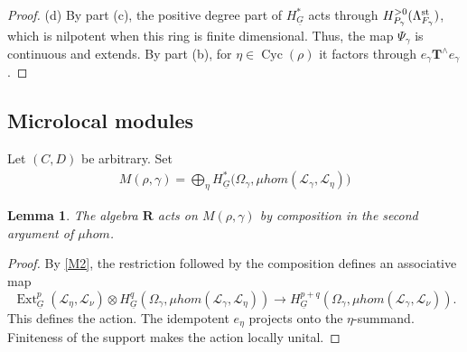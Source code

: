 \documentclass[11pt,reqno]{amsart}
\newtheorem{Lemma}[Theorem]{Lemma}
\theoremstyle{definition}
\theoremstyle{remark}
\def\dG{\underline G}
\def\Ext{\operatorname{Ext}}
\def\Cyc{\operatorname{Cyc}}
\def\muhom{\mu hom}
\def\bR{\mathbf R}
\def\bT{\mathbf T}
\begin{document}
\begin{proof}
(d) By part (c), the positive degree part of $H^*_{\dG}$ acts through $H^{>0}_{P_\gamma}(\Lambda^{\rm st}_{F_\gamma})$, which is nilpotent 
when this ring is finite dimensional.
Thus, the map $\Psi_\gamma$ is continuous and extends. 
By part (b), for $\eta\in\Cyc(\rho)$ it factors through $e_\gamma \bT^\wedge e_\gamma$.
\end{proof}



\subsection{Microlocal modules}
\label{subsec:microlocal-module}
Let $(C,D)$ be arbitrary. Set
\begin{align}\label{microlocal-module}
 M(\rho,\gamma)=
 \bigoplus_\eta
 H_{\dG}^*\bigl(\Omega_\gamma,
             \muhom(\mathscr L_\gamma,\mathscr L_\eta)\bigr)\end{align}

 
 \begin{Lemma}           
The algebra $\bR$ acts on $M(\rho,\gamma)$
by composition in the second argument of $\muhom$. 
\end{Lemma}

\begin{proof}
By \ref{M2}, the restriction followed by the composition defines an associative map
\[
 \Ext^p_{\dG}(\mathscr L_\eta,\mathscr L_\nu)\otimes
 H_{\dG}^q(\Omega_\gamma,\muhom(\mathscr L_\gamma,\mathscr L_\eta))
 \longrightarrow
 H_{\dG}^{p+q}(\Omega_\gamma,\muhom(\mathscr L_\gamma,\mathscr L_\nu)).
\]
This defines the action. The idempotent $e_\eta$ projects onto the
$\eta$-summand. Finiteness of the support makes the action locally unital.
\end{proof}
\end{document}
